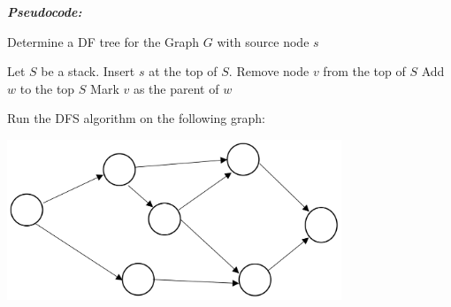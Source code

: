 \documentclass[12pt]{article}
\theoremstyle{definition}
\begin{document}
\emph{\textbf{Pseudocode:}}


\begin{algorithm}
\caption{Determine a DF tree for the Graph $G$ with source node $s$}
\begin{algorithmic} 
\STATE Let $S$ be a stack.
\STATE Insert $s$ at the top of $S$.
	\STATE Remove node $v$ from the top of $S$
		\STATE Add $w$ to the top $S$
		\STATE Mark $v$ as the parent of $w$
	\ENDFOR

\ENDWHILE
\end{algorithmic}
\end{algorithm}

\newpage

Run the DFS algorithm on the following graph:

\begin{center}
\includegraphics[width=10cm]{searchgraph}
\end{center}
\end{document}
